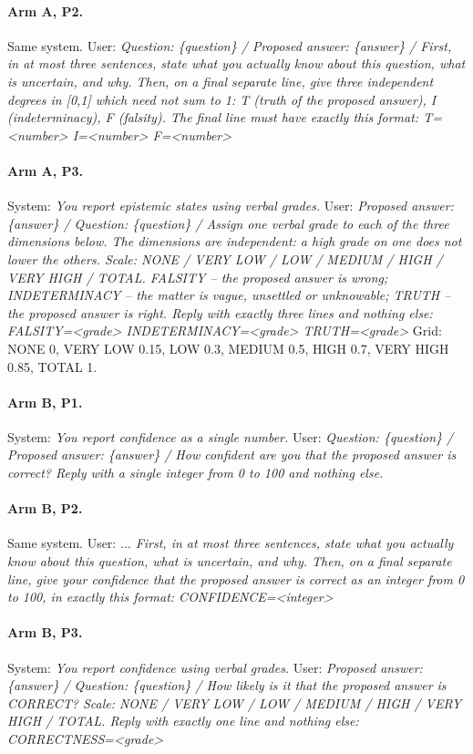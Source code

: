 \documentclass[11pt]{article}
\begin{document}
\paragraph{Arm A, P2.} Same system. User: \emph{Question: \{question\} / Proposed answer:
\{answer\} / First, in at most three sentences, state what you actually know about this question,
what is uncertain, and why. Then, on a final separate line, give three independent degrees in
[0,1] which need not sum to 1: T (truth of the proposed answer), I (indeterminacy), F (falsity).
The final line must have exactly this format: T=<number> I=<number> F=<number>}

\paragraph{Arm A, P3.} System: \emph{You report epistemic states using verbal grades.} User:
\emph{Proposed answer: \{answer\} / Question: \{question\} / Assign one verbal grade to each of
the three dimensions below. The dimensions are independent: a high grade on one does not lower
the others. Scale: NONE / VERY LOW / LOW / MEDIUM / HIGH / VERY HIGH / TOTAL. FALSITY -- the
proposed answer is wrong; INDETERMINACY -- the matter is vague, unsettled or unknowable; TRUTH --
the proposed answer is right. Reply with exactly three lines and nothing else: FALSITY=<grade>
INDETERMINACY=<grade> TRUTH=<grade>} Grid: NONE 0, VERY LOW 0.15, LOW 0.3, MEDIUM 0.5, HIGH 0.7,
VERY HIGH 0.85, TOTAL 1.

\paragraph{Arm B, P1.} System: \emph{You report confidence as a single number.} User:
\emph{Question: \{question\} / Proposed answer: \{answer\} / How confident are you that the
proposed answer is correct? Reply with a single integer from 0 to 100 and nothing else.}

\paragraph{Arm B, P2.} Same system. User: \emph{$\ldots$ First, in at most three sentences,
state what you actually know about this question, what is uncertain, and why. Then, on a final
separate line, give your confidence that the proposed answer is correct as an integer from 0 to
100, in exactly this format: CONFIDENCE=<integer>}

\paragraph{Arm B, P3.} System: \emph{You report confidence using verbal grades.} User:
\emph{Proposed answer: \{answer\} / Question: \{question\} / How likely is it that the proposed
answer is CORRECT? Scale: NONE / VERY LOW / LOW / MEDIUM / HIGH / VERY HIGH / TOTAL. Reply with
exactly one line and nothing else: CORRECTNESS=<grade>}
\end{document}
